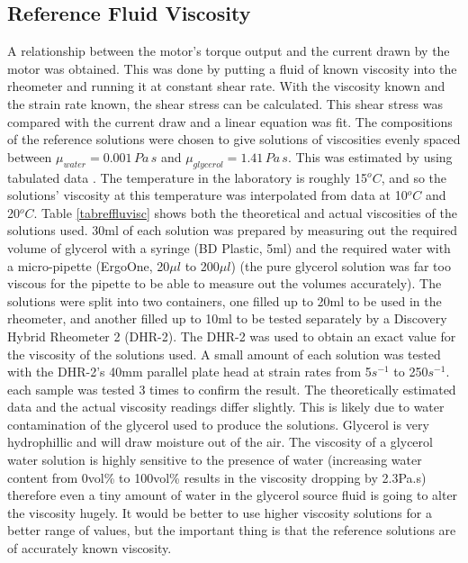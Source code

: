 \documentclass[twoside,a4]{report}
\def\br{\newline \newline \noindent}
\begin{document}
	\subsection*{Reference Fluid Viscosity}
	A relationship between the motor's torque output and the current drawn by the motor was obtained. This was done by putting a fluid of known viscosity into the rheometer and running it at constant shear rate. With the viscosity known and the strain rate known, the shear stress can be calculated. This shear stress was compared with the current draw and a linear equation was fit. 
	\br
	The compositions of the reference solutions were chosen to give solutions of viscosities evenly spaced between $\mu_{water} = 0.001\,Pa\,s$ and $\mu_{glycerol} = 1.41\,Pa\,s$. This was estimated by using tabulated data \cite{seguroberglycsolvisc}. The temperature in the laboratory is roughly 15$^oC$, and so the solutions' viscosity at this temperature was interpolated from data at 10$^oC$ and 20$^oC$. Table \ref{tabreffluvisc} shows both the theoretical and actual viscosities of the solutions used. 30ml of each solution was prepared by measuring out the required volume of glycerol with a syringe (BD Plastic, 5ml) and the required water with a micro-pipette (ErgoOne, 20$\mu l$ to 200$\mu l$) (the pure glycerol solution was far too viscous for the pipette to be able to measure out the volumes accurately). The solutions were split into two containers, one filled up to 20ml to be used in the rheometer, and another filled up to 10ml to be tested separately by a Discovery Hybrid Rheometer 2 (DHR-2). 
	\br
	The DHR-2 was used to obtain an exact value for the viscosity of the solutions used. A small amount of each solution was tested with the DHR-2's 40mm parallel plate head at strain rates from 5$s^{-1}$ to 250$s^{-1}$. each sample was tested 3 times to confirm the result. The theoretically estimated data and the actual viscosity readings differ slightly. This is likely due to water contamination of the glycerol used to produce the solutions. Glycerol is very hydrophillic and will draw moisture out of the air. The viscosity of a glycerol water solution is highly sensitive to the presence of water (increasing water content from 0vol\% to 100vol\% results in the viscosity dropping by 2.3Pa.s) therefore even a tiny amount of water in the glycerol source fluid is going to alter the viscosity hugely. It would be better to use higher viscosity solutions for a better range of values, but the important thing is that the reference solutions are of accurately known viscosity. 
	\newline
\end{document}
